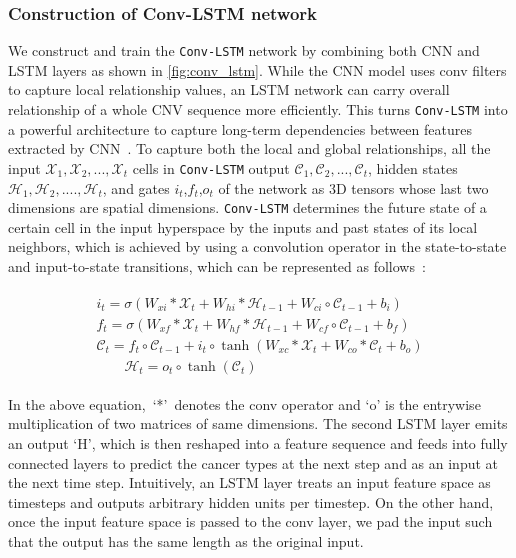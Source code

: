 \subsubsection{Construction of Conv-LSTM network }
We construct and train the \texttt{Conv-LSTM} network by combining both CNN and LSTM layers as shown in \cref{fig:conv_lstm}. While the CNN model uses conv filters to capture local relationship values, an LSTM network can carry overall relationship of a whole CNV sequence more efficiently. This turns \texttt{Conv-LSTM} into a powerful architecture to capture long-term dependencies between features extracted by CNN~\cite{karim2019drug}. To capture both the local and global relationships, all the input $\mathcal{X}_{1},\mathcal{X}_{2},...,\mathcal{X}_{t}$ cells in \texttt{Conv-LSTM} output $\mathcal{C}_{1},\mathcal{C}_{2},...,\mathcal{C}_{t}$, hidden states $\mathcal{H}_{1},\mathcal{H}_{2},....,\mathcal{H}_{t}$, and gates $i_t$,$f_t$,$o_t$ of the network as 3D tensors whose last two dimensions are spatial dimensions. %
\texttt{Conv-LSTM} determines the future state of a certain cell in the input hyperspace by the inputs and past states of its local neighbors, which is achieved by using a convolution operator in the state-to-state and input-to-state transitions, which can be represented as follows~\cite{Conv_LSTM1,karimACCA2019}:

\vspace{-4mm}
\begin{align}
    \begin{array}{c}
            {i_{t}=\sigma\left(W_{x i} * \mathcal{X}_{t}+W_{h i} * \mathcal{H}_{t-1}+W_{c i} \circ \mathcal{C}_{t-1}+b_{i}\right)} \\
            {f_{t}=\sigma\left(W_{x f} * \mathcal{X}_{t}+W_{h f} * \mathcal{H}_{t-1}+W_{c f} \circ \mathcal{C}_{t-1}+b_{f}\right)} \\
            {\mathcal{C}_{t}=f_{t} \circ \mathcal{C}_{t-1}+i_{t} \circ \tanh \left(W_{x c} * \mathcal{X}_{t}+W_{c o} * \mathcal{C}_{t}+b_{o}\right)} \\
            {\qquad \mathcal{H}_{t}=o_{t} \circ \tanh \left(\mathcal{C}_{t}\right)}
    \end{array}
\end{align}
\vspace{-4mm}

\hspace*{3.5mm} In the above equation,~`*'~denotes the conv operator and `o' is the entrywise multiplication of two matrices of same dimensions. The second LSTM layer emits an output `H', which is then reshaped into a feature sequence and feeds into fully connected layers to predict the cancer types at the next step and as an input at the next time step. Intuitively, an LSTM layer treats an input feature space as timesteps and outputs arbitrary hidden units per timestep. On the other hand, once the input feature space is passed to the conv layer, we pad the input such that the output has the same length as the original input. 

